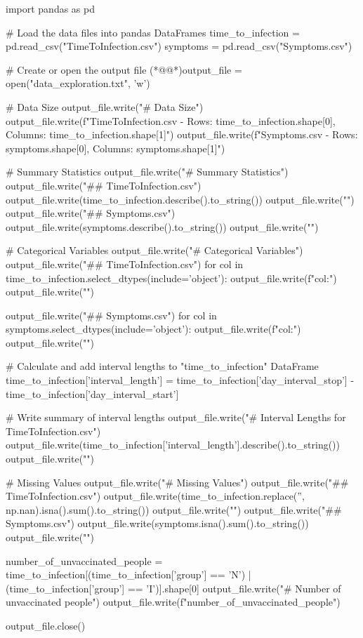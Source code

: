 \documentclass[11pt]{article}
\begin{document}
\begin{python}


import pandas as pd

# Load the data files into pandas DataFrames
time_to_infection = pd.read_csv("TimeToInfection.csv")
symptoms = pd.read_csv("Symptoms.csv")

# Create or open the output file
(*@@*)output_file = open("data_exploration.txt", 'w')

# Data Size
output_file.write("# Data Size\n")
output_file.write(f"TimeToInfection.csv - Rows: {time_to_infection.shape[0]}, Columns: {time_to_infection.shape[1]}\n")
output_file.write(f"Symptoms.csv - Rows: {symptoms.shape[0]}, Columns: {symptoms.shape[1]}\n\n")

# Summary Statistics
output_file.write("# Summary Statistics\n")
output_file.write("## TimeToInfection.csv\n")
output_file.write(time_to_infection.describe().to_string())
output_file.write("\n\n")
output_file.write("## Symptoms.csv\n")
output_file.write(symptoms.describe().to_string())
output_file.write("\n\n")

# Categorical Variables
output_file.write("# Categorical Variables\n")
output_file.write("## TimeToInfection.csv\n")
for col in time_to_infection.select_dtypes(include='object'):
    output_file.write(f"{col}:\n") 
output_file.write("\n")

output_file.write("## Symptoms.csv\n")
for col in symptoms.select_dtypes(include='object'):
    output_file.write(f"{col}:\n")
output_file.write("\n")

# Calculate and add interval lengths to "time_to_infection" DataFrame
time_to_infection['interval_length'] = time_to_infection['day_interval_stop'] - time_to_infection['day_interval_start']

# Write summary of interval lengths
output_file.write("# Interval Lengths for TimeToInfection.csv\n")
output_file.write(time_to_infection['interval_length'].describe().to_string())
output_file.write("\n\n")

# Missing Values
output_file.write("# Missing Values\n")
output_file.write("## TimeToInfection.csv\n")
output_file.write(time_to_infection.replace('', np.nan).isna().sum().to_string())
output_file.write("\n\n")
output_file.write("## Symptoms.csv\n")
output_file.write(symptoms.isna().sum().to_string())
output_file.write("\n\n")

number_of_unvaccinated_people = time_to_infection[(time_to_infection['group'] == 'N') | (time_to_infection['group'] == 'I')].shape[0]
output_file.write("# Number of unvaccinated people\n")
output_file.write(f"{number_of_unvaccinated_people}\n")

output_file.close()

\end{python}
\end{document}
